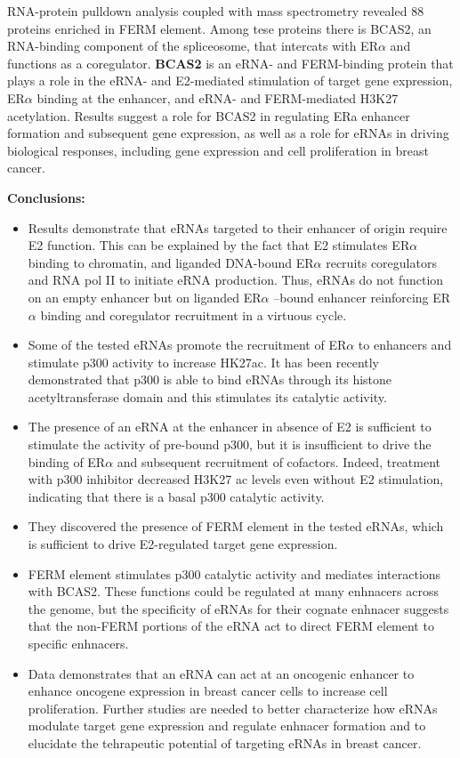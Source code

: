 RNA-protein pulldown analysis coupled with mass spectrometry revealed 88 proteins enriched in
FERM element. Among tese proteins there is BCAS2, an RNA-binding component of the spliceosome, that
intercats with ER$\alpha$ and functions as a coregulator. \textbf{BCAS2} is an eRNA- and FERM-binding protein that plays a role in the eRNA- and
E2-mediated stimulation of target gene expression, ER$\alpha$ binding at the
enhancer, and eRNA- and FERM-mediated H3K27 acetylation.  Results suggest a role for BCAS2 in regulating ERa enhancer formation and subsequent gene expression, as well as a role for eRNAs in driving biological responses, including gene expression and
cell proliferation in breast cancer.

\textbf{Conclusions:}
\begin{itemize}
\tightlist
\item Results demonstrate that eRNAs targeted to their enhancer of origin require E2 function. This can be
explained by the fact that E2 stimulates ER$\alpha$ binding to chromatin, and liganded DNA-bound ER$\alpha$
recruits coregulators and RNA pol II to initiate eRNA production. Thus, eRNAs do not function on an
empty enhancer but on liganded ER$\alpha$ –bound enhancer reinforcing ER$\alpha$ binding and coregulator
recruitment in a virtuous cycle.
\item Some of the tested eRNAs promote the recruitment of ER$\alpha$ to enhancers and stimulate p300 activity
to increase HK27ac. It has been recently demonstrated that p300 is able to bind eRNAs through its
histone acetyltransferase domain and this stimulates its catalytic activity.
\item The presence of an eRNA at the enhancer in absence of E2 is sufficient to stimulate the activity of
pre-bound p300, but it is insufficient to drive the binding of ER$\alpha$ and subsequent recruitment of
cofactors. Indeed, treatment with p300 inhibitor decreased H3K27 ac levels even without E2
stimulation, indicating that there is a basal p300 catalytic activity.
\item They discovered the presence of FERM element in the tested eRNAs, which is sufficient to drive
E2-regulated target gene expression.
\item FERM element stimulates p300 catalytic activity and mediates interactions with BCAS2. These
functions could be regulated at many enhnacers across the genome, but the specificity of eRNAs
for their cognate enhnacer suggests that the non-FERM portions of the eRNA act to direct FERM
element to specific enhnacers.
\item Data demonstrates that an eRNA can act at an oncogenic enhancer to enhance oncogene
expression in breast cancer cells to increase cell proliferation. Further studies are needed to
better characterize how eRNAs modulate target gene expression and regulate enhnacer
formation and to elucidate the tehrapeutic potential of targeting eRNAs in breast cancer.
\end{itemize}


